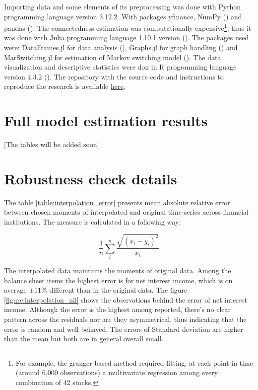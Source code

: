 \documentclass[12pt]{article}
\begin{document}
Importing data and some elements of its preprocessing was done with Python programming language version 3.12.2. With packages yfinance, NumPy (\citet{harris20}) and pandas (\citet{reback20}). The connectedness estimation was computationally expensive\footnote{For example, the granger based method required fitting, at each point in time (around 6,000 observations) a multivariate regression among every combination of 42 stocks.}, thus it was done with Julia programming language 1.10.1 version (\citet{bezanson17}). The packages used were: DataFrames.jl for data analysis (\citet{kaminski23}), Graphs.jl for graph handling (\citet{fairbanks21}) and MarSwitching.jl for estimation of Markov switching model (\citet{dadej24}). The data visualization and descriptive statistics were don in R programming language version 4.3.2 (\citet{rcore23}). The repository with the source code and instructions to reproduce the research is available \href{https://github.com/m-dadej/robust\_fragile}{\underline{here}}.

\section{Full model estimation results}\label{appendix:model_params}
[The tables will be added soon]

\section{Robustness check details}\label{appendix:robustness}

The table \ref{table:interpolation_error} presents mean absolute relative error between chosen moments of interpolated and original time-series across financial institutions. The measure is calculated in a following way:

\begin{equation}
	\frac{1}{n} \sum_{i}^{n} \frac{\sqrt{(x_i - y_i)^2}}{x_i} 
\end{equation}

The interpolated data maintains the moments of original data. Among the balance sheet items the highest error is for net interest income, which is on average $\pm 11\%$ different than in the original data. The figure \ref{figure:interpolation_nii} shows the observations behind the error of net interest income. Although the error is the highest among reported, there's no clear pattern across the residuals nor are they asymmetrical, thus indicating that the error is random and well behaved. The errors of Standard deviation are higher than the mean but both are in general overall small. 
\end{document}
